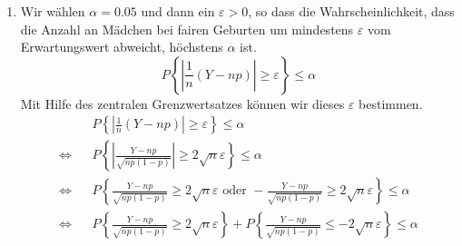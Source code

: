 \documentclass[a4paper]{scrartcl}
\newcommand{\gdw}{\Leftrightarrow}
\begin{document}
\begin{enumerate}[label=\bfseries\arabic*.]
\begin{enumerate}[label=(\alph*)]
            \item
                Wir wählen $\alpha = \num{0,05}$ und dann ein $\varepsilon > 0$,
                so dass die Wahrscheinlichkeit, dass die Anzahl an Mädchen bei
                fairen Geburten um mindestens $\varepsilon$ vom Erwartungswert
                abweicht, höchstens $\alpha$ ist.
                \begin{equation*}
                    P \left\{
                        \left| \frac{1}{n} (Y - np) \right| \geq \varepsilon
                    \right\} \leq \alpha
                \end{equation*}
                Mit Hilfe des zentralen Grenzwertsatzes können wir dieses
                $\varepsilon$ bestimmen.
                \begin{equation*}
                    \begin{alignedat}{2}
                        && P \left\{
                            \left| \frac{1}{n} (Y - np) \right| \geq \varepsilon
                        \right\} 
                        \leq \alpha \\
                        \gdw&& P \left\{
                            \left| \frac{Y - np}{\sqrt{np(1-p)}} \right|
                            \geq 2 \sqrt{n} \varepsilon
                        \right\} 
                        \leq \alpha \\
                        \gdw&& P \left\{
                            \frac{Y - np}{\sqrt{np(1-p)}}
                            \geq 2 \sqrt{n} \varepsilon
                            \text{ oder }
                            -\frac{Y - np}{\sqrt{np(1-p)}}
                            \geq 2 \sqrt{n} \varepsilon
                        \right\} 
                        \leq \alpha \\
                        \gdw&& P \left\{
                            \frac{Y - np}{\sqrt{np(1-p)}}
                            \geq 2 \sqrt{n} \varepsilon
                        \right\} 
                        +
                        P \left\{
                            \frac{Y - np}{\sqrt{np(1-p)}}
                            \leq -2 \sqrt{n} \varepsilon
                        \right\} 
                        \leq \alpha \\

\end{alignedat}
\end{equation*}
\end{enumerate}
\end{enumerate}
\end{document}
